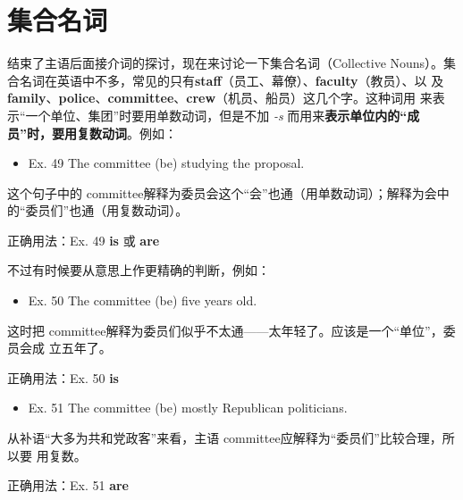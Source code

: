 \section{集合名词}

结束了主语后面接介词的探讨，现在来讨论一下集合名词（Collective Nouns）。集
合名词在英语中不多，常见的只有\textbf{staff}（员工、幕僚）、\textbf{faculty}（教员）、以
及\textbf{family}、\textbf{police}、\textbf{committee}、\textbf{crew}（机员、船员）这几个字。这种词用
来表示“一个单位、集团”时要用单数动词，但是不加 \emph{-s} 而用来\textbf{表示单位内的“成
  员”时，要用复数动词}。例如：

\begin{mybox}
\begin{itemize}
\item   Ex. 49 The committee (be) studying the proposal.
\end{itemize}

这个句子中的 committee解释为委员会这个“会”也通（用单数动词）；解释为会中
的“委员们”也通（用复数动词）。

\tcblower

正确用法：Ex. 49 \textbf{is} 或 \textbf{are}
\end{mybox}

不过有时候要从意思上作更精确的判断，例如：
\begin{mybox}

\begin{itemize}
\item   Ex. 50 The committee (be) five years old.
\end{itemize}

这时把 committee解释为委员们似乎不太通——太年轻了。应该是一个“单位”，委员会成
立五年了。

\tcblower

正确用法：Ex. 50 \textbf{is}
\end{mybox}


\begin{mybox}

\begin{itemize}
\item   Ex. 51 The committee (be) mostly Republican politicians.
\end{itemize}

从补语“大多为共和党政客”来看，主语 committee应解释为“委员们”比较合理，所以要
用复数。

\tcblower

正确用法：Ex. 51 \textbf{are}
\end{mybox}

